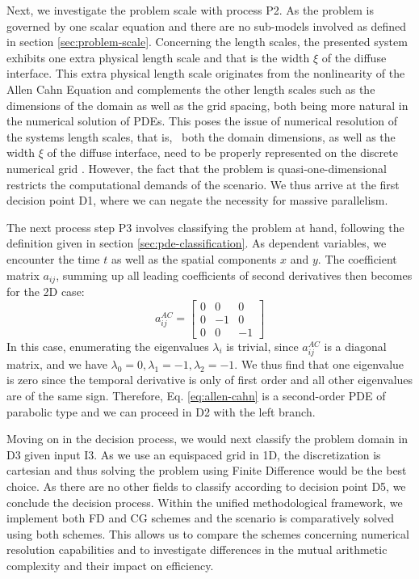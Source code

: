 \documentclass[asi,article,submit,moreauthors]{Definitions/mdpi}
\begin{document}
Next, we investigate the problem scale with process P2.
As the problem is governed by one scalar equation and there are no sub-models involved as defined in section \ref{sec:problem-scale}. 
Concerning the length scales, the presented system exhibits one extra physical length scale and that is the width $\xi$ of the diffuse interface.
This extra physical length scale originates from the nonlinearity of the Allen Cahn Equation and complements the other length scales such as the dimensions of the domain as well as the grid spacing, both being more natural in the numerical solution of PDEs. 
This poses the issue of numerical resolution of the systems length scales, that is, ~both the domain dimensions, as well as the width $\xi$ of the diffuse interface, need to be properly represented on the discrete numerical grid \cite{fleckSharpPhasefieldModeling2023,fleckFrictionlessMotionDiffuse2022}.
However, the fact that the problem is quasi-one-dimensional restricts the computational demands of the scenario.
We thus arrive at the first decision point D1, where we can negate the necessity for massive parallelism.

The next process step P3 involves classifying the problem at hand, following the definition given in section \ref{sec:pde-classification}.
As dependent variables, we encounter the time $t$ as well as the spatial components $x$ and $y$.
The coefficient matrix $a_{ij}$, summing up all leading coefficients of second derivatives then becomes for the 2D case:
\begin{equation}
    a_{ij}^{AC} = \begin{bmatrix}
        0 & 0 & 0 \\
        0 & -1 & 0 \\
        0 & 0 & -1
    \end{bmatrix}
\end{equation}
In this case, enumerating the eigenvalues $\lambda_i$ is trivial, since $a_{ij}^{AC}$ is a diagonal matrix, and we have $\lambda_0 = 0, \lambda_1 = -1, \lambda_2 = -1$.
We thus find that one eigenvalue is zero since the temporal derivative is only of first order and all other eigenvalues are of the same sign.
Therefore, Eq. \ref{eq:allen-cahn} is a second-order PDE of parabolic type and we can proceed in D2 with the left branch.

Moving on in the decision process, we would next classify the problem domain in D3 given input I3.
As we use an equispaced grid in 1D, the discretization is cartesian and thus solving the problem using Finite Difference would be the best choice.
As there are no other fields to classify according to decision point D5, we conclude the decision process.
Within the unified methodological framework, we implement both FD and CG schemes and the scenario is comparatively solved using both schemes.
This allows us to compare the schemes concerning numerical resolution capabilities and to investigate differences in the mutual arithmetic complexity and their impact on efficiency. 
\end{document}
